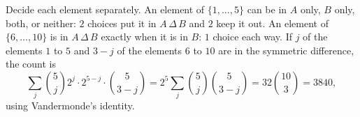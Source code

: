 Decide each element separately. An element of $\{1,\dots,5\}$ can be in $A$ only, $B$ only, both, or neither: $2$ choices put it in $A\,\Delta\,B$ and $2$ keep it out. An element of $\{6,\dots,10\}$ is in $A\,\Delta\,B$ exactly when it is in $B$: $1$ choice each way. If $j$ of the elements $1$ to $5$ and $3-j$ of the elements $6$ to $10$ are in the symmetric difference, the count is
\[\sum_{j}\binom5j2^j\cdot2^{5-j}\cdot\binom5{3-j}=2^5\sum_j\binom5j\binom5{3-j}=32\binom{10}{3}=\boxed{3840},\]
using Vandermonde's identity.
